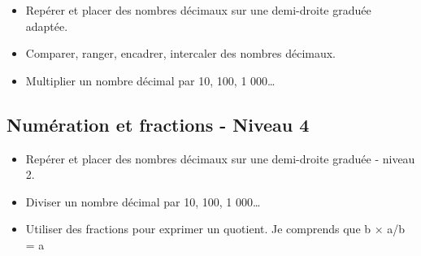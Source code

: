 \documentclass[a4paper,12pt,fleqn]{article}
\begin{document}
\begin{itemize}
	\item {}Repérer et placer des nombres décimaux sur une demi-droite graduée adaptée.
	\item {}Comparer, ranger, encadrer, intercaler des nombres décimaux.
	\item {}Multiplier un nombre décimal par 10, 100, 1 000…
\end{itemize}

\subsection*{Numération et fractions - Niveau 4}

\begin{itemize}
	\item {}Repérer et placer des nombres décimaux sur une demi-droite graduée - niveau 2.
	\item {}Diviser un nombre décimal par 10, 100, 1 000…
	\item {}Utiliser des fractions pour exprimer un quotient. Je comprends que b × a/b = a
\end{itemize}

	
\end{document}
